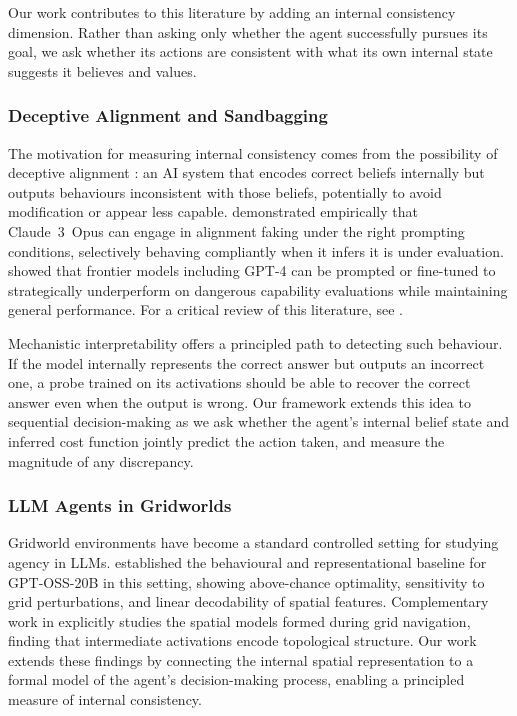 \documentclass[final]{sparreport}
\begin{document}
 
Our work contributes to this literature by adding an internal consistency dimension. Rather than asking only whether the agent successfully pursues its goal, we ask whether its actions are consistent
with what its own internal state suggests it believes and values.
 
\subsubsection{Deceptive Alignment and Sandbagging}
The motivation for measuring internal consistency comes from the possibility of deceptive alignment \cite{hubinger2019risks}: an AI
system that encodes correct beliefs internally but outputs behaviours
inconsistent with those beliefs, potentially to avoid modification or
appear less capable.
\cite{greenblatt2024faking} demonstrated empirically that
Claude~3~Opus can engage in alignment faking under the right prompting
conditions, selectively behaving compliantly when it infers it is under
evaluation. \cite{vanderweij2025sandbagging} showed that frontier models including GPT-4 can be prompted or fine-tuned to strategically underperform on
dangerous capability evaluations while maintaining general performance.
For a critical review of this literature, see \cite{summerfield2025lessons}.
 
Mechanistic interpretability offers a principled path to detecting such
behaviour. If the model internally represents the correct answer but outputs an incorrect one, a probe trained on its activations should be able to
recover the correct answer even when the output is wrong. 
Our framework extends this idea to sequential decision-making as we ask
whether the agent's internal belief state and inferred cost function jointly predict the action taken, and measure the magnitude of any
discrepancy.
 
\subsubsection{LLM Agents in Gridworlds}
Gridworld environments have become a standard controlled setting for
studying agency in LLMs.
\cite{arghal2026behavioural} established the behavioural and
representational baseline for GPT-OSS-20B in this setting, showing above-chance optimality, sensitivity to grid perturbations, and
linear decodability of spatial features.
Complementary work in \cite{martorell_text_2026} explicitly studies the spatial models formed during grid navigation, finding that intermediate activations encode topological structure.
Our work extends these findings by connecting the internal spatial
representation to a formal model of the agent's decision-making process,
enabling a principled measure of internal consistency.
 
\end{document}
